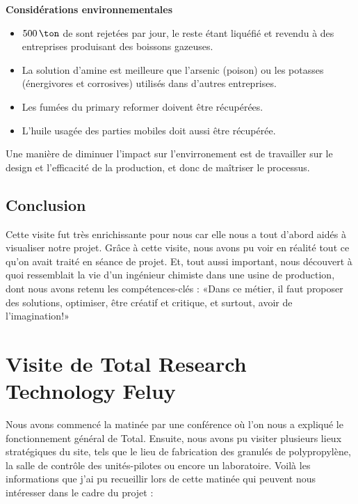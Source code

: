 \textbf{Considérations environnementales}
\begin{itemize}
\item $500\,\ton$ de  sont rejetées par jour, le reste étant liquéfié et revendu à des entreprises produisant des boissons gazeuses.
\item La solution d'amine est meilleure que l'arsenic (poison) ou les potasses (énergivores et corrosives) utilisés dans d'autres entreprises.
\item Les fumées du primary reformer doivent être récupérées.
\item L'huile usagée des parties mobiles doit aussi être récupérée.
\end{itemize}
Une manière de diminuer l'impact sur l'envirronement est de
travailler sur le design et l'efficacité de la production,
et donc de maîtriser le processus.

\subsection{Conclusion}

Cette visite fut très enrichissante pour nous car elle nous a tout d'abord aidés à visualiser notre projet. Grâce à cette visite, nous avons pu voir en réalité tout ce qu'on avait traité en séance de projet.
Et, tout aussi important, nous découvert à quoi ressemblait la vie d'un ingénieur chimiste dans une usine de production, dont nous avons retenu les compétences-clés : «Dans ce métier, il faut proposer des solutions, optimiser, être créatif et critique, et surtout, avoir de l'imagination!» 

\section{Visite de Total Research Technology Feluy}
Nous avons commencé la matinée par une conférence où l'on nous a expliqué le fonctionnement général de Total. Ensuite, nous avons pu visiter plusieurs lieux stratégiques du site, tels que le lieu de fabrication des granulés de polypropylène, la salle de contrôle des unités-pilotes ou encore un laboratoire.
Voilà les informations que j'ai pu recueillir lors de cette matinée qui peuvent nous intéresser dans le cadre du projet :
